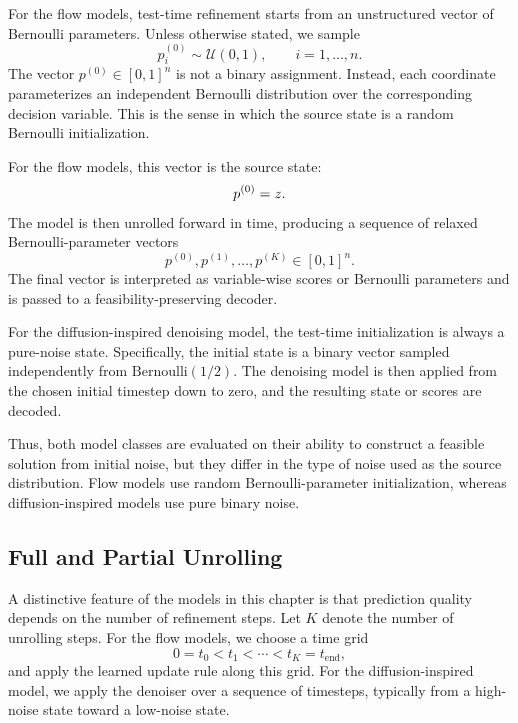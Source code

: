 For the flow models, test-time refinement starts from an unstructured vector of Bernoulli parameters. Unless otherwise stated, we sample
\begin{equation}
    p^{(0)}_i \sim \mathcal{U}(0,1),
    \qquad i=1,\ldots,n.
    \label{eq:uniform_initialization}
\end{equation}
The vector $p^{(0)}\in[0,1]^n$ is not a binary assignment. Instead, each coordinate parameterizes an independent Bernoulli distribution over the corresponding decision variable. This is the sense in which the source state is a random Bernoulli initialization.

For the flow models, this vector is the source state:
\begin{equation}
    p^{(0)} = z .
\end{equation}
The model is then unrolled forward in time, producing a sequence of relaxed Bernoulli-parameter vectors
\begin{equation}
    p^{(0)}, p^{(1)}, \ldots, p^{(K)} \in [0,1]^n.
\end{equation}
The final vector is interpreted as variable-wise scores or Bernoulli parameters and is passed to a feasibility-preserving decoder.

For the diffusion-inspired denoising model, the test-time initialization is always a pure-noise state. Specifically, the initial state is a binary vector sampled independently from $\mathrm{Bernoulli}(1/2)$. The denoising model is then applied from the chosen initial timestep down to zero, and the resulting state or scores are decoded.

Thus, both model classes are evaluated on their ability to construct a feasible solution from initial noise, but they differ in the type of noise used as the source distribution. Flow models use random Bernoulli-parameter initialization, whereas diffusion-inspired models use pure binary noise.

\subsection{Full and Partial Unrolling}

A distinctive feature of the models in this chapter is that prediction quality depends on the number of refinement steps. Let $K$ denote the number of unrolling steps. For the flow models, we choose a time grid
\begin{equation}
    0=t_0<t_1<\cdots<t_K=t_{\mathrm{end}},
\end{equation}
and apply the learned update rule along this grid. For the diffusion-inspired model, we apply the denoiser over a sequence of timesteps, typically from a high-noise state toward a low-noise state.

